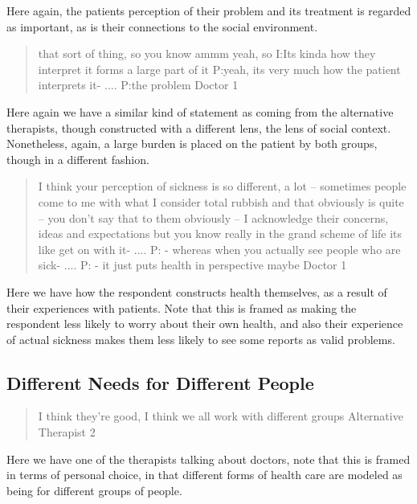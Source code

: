 Here again, the patients perception of their problem and its treatment is regarded as important, as is their connections to the social environment. 

\begin{quotation}
  
that sort of thing, so you know ammm yeah, so 
I:Its kinda how they interpret it forms a large part of it
P:yeah, its very much how the patient interprets it-
....
P:the problem 
Doctor 1
\end{quotation}

Here again we have a similar kind of statement as coming from the alternative therapists, though constructed with a different lens, the lens of social context. Nonetheless, again, a large burden is placed on the patient by both groups, though in a different fashion. 

\begin{quotation}
  I think your perception of sickness is so different, a lot – sometimes people come to me with what I consider total rubbish and that obviously is quite – you don't say that to them obviously – I acknowledge their concerns, ideas and expectations but you know really in the grand scheme of life its like get on with it-
....
P: - whereas when you actually see people who are sick-
....
P: - it just puts health in perspective maybe 
Doctor 1
\end{quotation}

Here we have how the respondent constructs health themselves, as a result of their experiences with patients. Note that this is framed as making the respondent less likely to worry about their own health, and also their experience of actual sickness makes them less likely to see some reports as valid problems. 


\subsection{Different Needs for Different People}
\label{sec:diff-needs-diff}

\begin{quotation}
  I think  they're good, I think we all work with different groups
Alternative Therapist 2
\end{quotation}

Here we have one of the therapists talking about doctors, note that this is framed in terms of personal choice, in that different forms of health care are modeled as being for different groups of people. 

